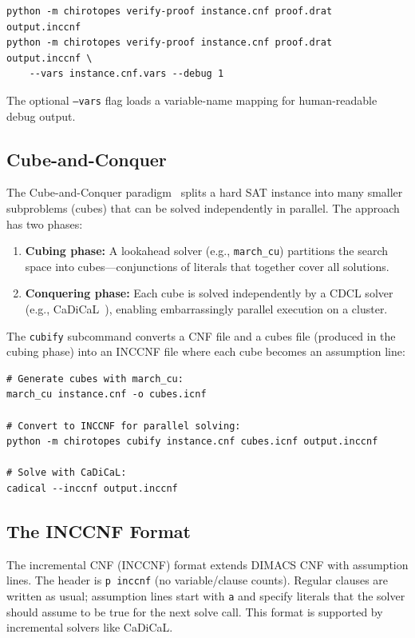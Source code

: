 \documentclass[11pt]{article}
\theoremstyle{definition}
\begin{document}
\begin{lstlisting}
python -m chirotopes verify-proof instance.cnf proof.drat output.inccnf
python -m chirotopes verify-proof instance.cnf proof.drat output.inccnf \
    --vars instance.cnf.vars --debug 1
\end{lstlisting}

The optional \texttt{--vars} flag loads a variable-name mapping for human-readable debug output.

\subsection{Cube-and-Conquer}

The Cube-and-Conquer paradigm~\cite{HeuleKM2012} splits a hard SAT instance into many smaller subproblems (cubes) that can be solved independently in parallel. The approach has two phases:
\begin{enumerate}
\item \textbf{Cubing phase:} A lookahead solver (e.g., \texttt{march\_cu}) partitions the search space into cubes---conjunctions of literals that together cover all solutions.
\item \textbf{Conquering phase:} Each cube is solved independently by a CDCL solver (e.g., CaDiCaL~\cite{Biere2019}), enabling embarrassingly parallel execution on a cluster.
\end{enumerate}

The \texttt{cubify} subcommand converts a CNF file and a cubes file (produced in the cubing phase) into an INCCNF file where each cube becomes an assumption line:

\begin{lstlisting}
# Generate cubes with march_cu:
march_cu instance.cnf -o cubes.icnf

# Convert to INCCNF for parallel solving:
python -m chirotopes cubify instance.cnf cubes.icnf output.inccnf

# Solve with CaDiCaL:
cadical --inccnf output.inccnf
\end{lstlisting}

\subsection{The INCCNF Format}

The incremental CNF (INCCNF) format extends DIMACS CNF with assumption lines. The header is \texttt{p inccnf} (no variable/clause counts). Regular clauses are written as usual; assumption lines start with \texttt{a} and specify literals that the solver should assume to be true for the next solve call. This format is supported by incremental solvers like CaDiCaL.
\end{document}
